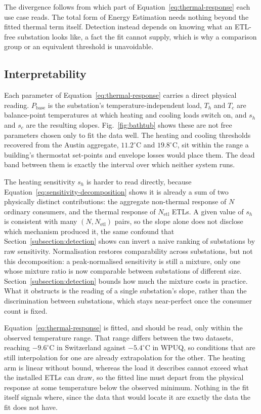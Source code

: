 \documentclass[9pt,journal,a4]{IEEEtran}
\begin{document}
The divergence follows from which part of Equation~\eqref{eq:thermal-response} each use case reads. The total form of Energy Estimation needs nothing beyond the fitted thermal term itself. Detection instead depends on knowing what an ETL-free substation looks like, a fact the fit cannot supply, which is why a comparison group or an equivalent threshold is unavoidable.


\subsection{Interpretability}
\label{subsection:interpretability}

Each parameter of Equation~\eqref{eq:thermal-response} carries a direct physical reading. $P_{\mathrm{base}}$ is the substation's temperature-independent load, $T_h$ and $T_c$ are balance-point temperatures at which heating and cooling loads switch on, and $s_h$ and $s_c$ are the resulting slopes. Fig.~\ref{fig:bathtub} shows these are not free parameters chosen only to fit the data well. The heating and cooling thresholds recovered from the Austin aggregate, $11.2^\circ$C and $19.8^\circ$C, sit within the range a building's thermostat set-points and envelope losses would place them. The dead band between them is exactly the interval over which neither system runs.

The heating sensitivity $s_h$ is harder to read directly, because Equation~\eqref{eq:sensitivity-decomposition} shows it is already a sum of two physically distinct contributions: the aggregate non-thermal response of $N$ ordinary consumers, and the thermal response of $N_{\mathrm{etl}}$ ETLs. A given value of $s_h$ is consistent with many $(N, N_{\mathrm{etl}})$ pairs, so the slope alone does not disclose which mechanism produced it, the same confound that Section~\ref{subsection:detection} shows can invert a naive ranking of substations by raw sensitivity. Normalisation restores comparability across substations, but not this decomposition: a peak-normalised sensitivity is still a mixture, only one whose mixture ratio is now comparable between substations of different size. Section~\ref{subsection:detection} bounds how much the mixture costs in practice. What it obstructs is the reading of a single substation's slope, rather than the discrimination between substations, which stays near-perfect once the consumer count is fixed.

Equation~\eqref{eq:thermal-response} is fitted, and should be read, only within the observed temperature range. That range differs between the two datasets, reaching $-9.6^\circ$C in Switzerland against $-5.4^\circ$C in WPUQ, so conditions that are still interpolation for one are already extrapolation for the other. The heating arm is linear without bound, whereas the load it describes cannot exceed what the installed ETLs can draw, so the fitted line must depart from the physical response at some temperature below the observed minimum. Nothing in the fit itself signals where, since the data that would locate it are exactly the data the fit does not have.
\end{document}
